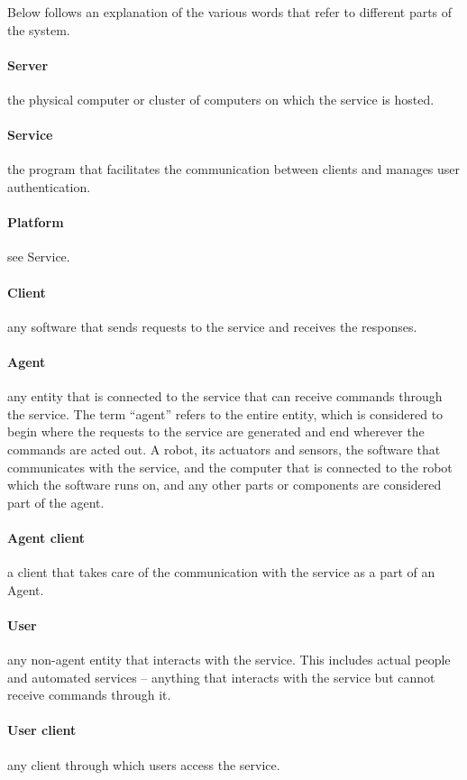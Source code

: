 Below follows an explanation of the various words that refer to different parts of the system.

\paragraph{Server} the physical computer or cluster of computers on which the service is hosted.

\paragraph{Service} the program that facilitates the communication between clients and manages user authentication.

\paragraph{Platform} see Service.

\paragraph{Client} any software that sends requests to the service and receives the responses.

\paragraph{Agent} any entity that is connected to the service that can receive commands through the service.
The term ``agent'' refers to the entire entity, which is considered to begin where the requests to the service are generated and end wherever the commands are acted out.
A robot, its actuators and sensors, the software that communicates with the service, and the computer that is connected to the robot which the software runs on, and any other parts or components are considered part of the agent.

\paragraph{Agent client} a client that takes care of the communication with the service as a part of an Agent.

\paragraph{User} any non-agent entity that interacts with the service.
This includes actual people and automated services -- anything that interacts with the service but cannot receive commands through it.

\paragraph{User client} any client through which users access the service.


